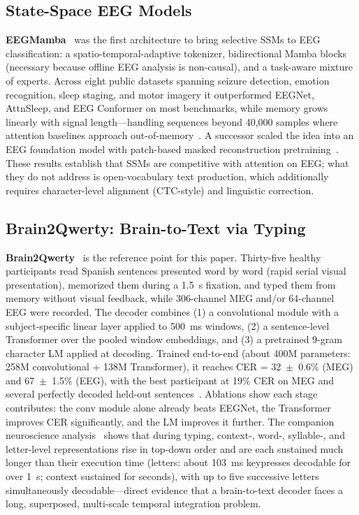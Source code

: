 \documentclass[conference]{IEEEtran}
\begin{document}
\subsection{State-Space EEG Models}
\textbf{EEGMamba}~\cite{gui2024eegmamba} was the first architecture to bring
selective SSMs to EEG classification: a spatio-temporal-adaptive tokenizer,
bidirectional Mamba blocks (necessary because offline EEG analysis is
non-causal), and a task-aware mixture of experts. Across eight public
datasets spanning seizure detection, emotion recognition, sleep staging, and
motor imagery it outperformed EEGNet, AttnSleep, and EEG Conformer on most
benchmarks, while memory grows linearly with signal length---handling
sequences beyond 40,000 samples where attention baselines approach
out-of-memory~\cite{gui2024eegmamba}. A successor scaled the idea into an
EEG foundation model with patch-based masked reconstruction
pretraining~\cite{wang2025eegmamba}. These results establish that SSMs are
competitive with attention on EEG; what they do not address is
open-vocabulary text production, which additionally requires character-level
alignment (CTC-style) and linguistic correction.

\subsection{Brain2Qwerty: Brain-to-Text via Typing}
\textbf{Brain2Qwerty}~\cite{levy2025} is the reference point for this paper.
Thirty-five healthy participants read Spanish sentences presented word by
word (rapid serial visual presentation), memorized them during a 1.5~s
fixation, and typed them from memory without visual feedback, while
306-channel MEG and/or 64-channel EEG were recorded. The decoder combines
(1) a convolutional module with a subject-specific linear layer applied to
500~ms windows, (2) a sentence-level Transformer over the pooled window
embeddings, and (3) a pretrained 9-gram character LM applied at decoding.
Trained end-to-end (about 400M parameters: 258M convolutional + 138M
Transformer), it reaches CER = 32~$\pm$~0.6\% (MEG) and 67~$\pm$~1.5\%
(EEG), with the best participant at 19\% CER on MEG and several perfectly
decoded held-out sentences~\cite{levy2025}. Ablations show each stage
contributes: the conv module alone already beats EEGNet, the Transformer
improves CER significantly, and the LM improves it further. The companion
neuroscience analysis~\cite{zhang2025hierarchy} shows that during typing,
context-, word-, syllable-, and letter-level representations rise in
top-down order and are each sustained much longer than their execution time
(letters: about 103~ms keypresses decodable for over 1~s; context sustained
for seconds), with up to five successive letters simultaneously
decodable---direct evidence that a brain-to-text decoder faces a long,
superposed, multi-scale temporal integration problem.
\end{document}
